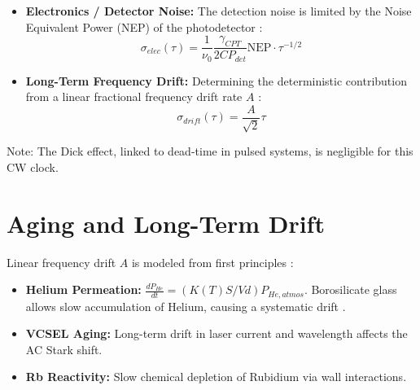 \documentclass[11pt,a4paper]{article}
\begin{document}
\begin{itemize}
    \begin{equation}
    \sigma_B(\tau) = \frac{2 K_Z B \sigma_{B,rms}}{\nu_0} \tau^{-1/2}
    \end{equation}
    where $K_Z = 575.152$~Hz/G$^2$ and $\sigma_{B,rms}$ is the rms magnetic field fluctuation at 1~s integration.
    \item \textbf{Electronics / Detector Noise:} The detection noise is limited by the Noise Equivalent Power (NEP) of the photodetector \cite{Knappe2004}:
    \begin{equation}
    \sigma_{elec}(\tau) = \frac{1}{\nu_0} \frac{\gamma_{CPT}}{2 C P_{det}} \text{NEP} \cdot \tau^{-1/2}
    \end{equation}
    \item \textbf{Long-Term Frequency Drift:} Determining the deterministic contribution from a linear fractional frequency drift rate $A$ \cite{Steck2021, Riley2008}:
    \begin{equation}
    \sigma_{drift}(\tau) = \frac{A}{\sqrt{2}} \tau
    \end{equation}
\end{itemize}
Note: The Dick effect, linked to dead-time in pulsed systems, is negligible for this CW clock.

\section{Aging and Long-Term Drift}
Linear frequency drift $A$ is modeled from first principles \cite{Marlow2021}:
\begin{itemize}
    \item \textbf{Helium Permeation:} $\frac{dP_{He}}{dt} = (K(T) S / V d) P_{He,atmos}$. Borosilicate glass allows slow accumulation of Helium, causing a systematic drift \cite{Knappe2004}.
    \item \textbf{VCSEL Aging:} Long-term drift in laser current and wavelength affects the AC Stark shift.
    \item \textbf{Rb Reactivity:} Slow chemical depletion of Rubidium via wall interactions.
\end{itemize}
\end{document}
